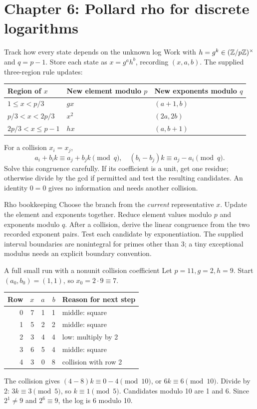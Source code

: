 \documentclass[11pt,a4paper]{article}
\begin{document}
\section{Chapter 6: Pollard rho for discrete logarithms}
\begin{concept}{Track how every state depends on the unknown log}
Work with \(h=g^k\in(\mathbb Z/p\mathbb Z)^\times\) and \(q=p-1\). Store each state as \(x=g^ah^b\), recording \((x,a,b)\). The supplied three-region rule updates:
\begin{center}\begin{tabular}{lll}\toprule Region of \(x\)&New element modulo \(p\)&New exponents modulo \(q\)\\\midrule
\(1\le x<p/3\)&\(gx\)&\((a+1,b)\)\\
\(p/3<x<2p/3\)&\(x^2\)&\((2a,2b)\)\\
\(2p/3<x\le p-1\)&\(hx\)&\((a,b+1)\)\\\bottomrule\end{tabular}\end{center}
For a collision \(x_i=x_j\),
\[a_i+b_i k\equiv a_j+b_jk\pmod q,\quad \boxed{(b_i-b_j)k\equiv a_j-a_i\pmod q.}\]
Solve this congruence carefully. If its coefficient is a unit, get one residue; otherwise divide by the gcd if permitted and test the resulting candidates. An identity \(0=0\) gives no information and needs another collision.
\end{concept}
\begin{method}{Rho bookkeeping}
Choose the branch from the \emph{current} representative \(x\). Update the element and exponents together. Reduce element values modulo \(p\) and exponents modulo \(q\). After a collision, derive the linear congruence from the two recorded exponent pairs. Test each candidate by exponentiation. The supplied interval boundaries are nonintegral for primes other than 3; a tiny exceptional modulus needs an explicit boundary convention.
\end{method}
\begin{example}{A full small run with a nonunit collision coefficient}
Let \(p=11,g=2,h=9\). Start \((a_0,b_0)=(1,1)\), so \(x_0=2\cdot9\equiv7\).
\begin{center}\begin{tabular}{r|rrr|l}\toprule Row&\(x\)&\(a\)&\(b\)&Reason for next step\\\midrule
0&7&1&1&middle: square\\
1&5&2&2&middle: square\\
2&3&4&4&low: multiply by 2\\
3&6&5&4&middle: square\\
4&3&0&8&collision with row 2\\\bottomrule\end{tabular}\end{center}
The collision gives \((4-8)k\equiv0-4\pmod{10}\), or \(6k\equiv6\pmod{10}\). Divide by 2: \(3k\equiv3\pmod5\), so \(k\equiv1\pmod5\). Candidates modulo 10 are 1 and 6. Since \(2^1\ne9\) and \(2^6\equiv9\), the log is 6 modulo 10.
\end{example}
\end{document}
